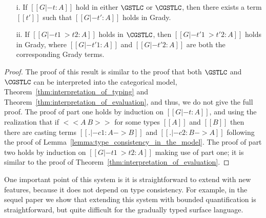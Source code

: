 \begin{lemma}[Translations]
  \label{lemma:translations}
  \begin{center}
    \begin{itemize}
    \item[] 
    \item[i.] If $[[G |- t : A]]$ hold in either $\GSTLC$ or
      $\CGSTLC$, then there exists a term
      $[[t']]$ such that $[[G |- t' : A]]$ holds in Grady.
    \item[ii.] If $[[G |- t1 ~> t2 : A]]$ holds in $\CGSTLC$, then
      $[[G |- t'1 ~> t'2 : A]]$ holds in Grady, where $[[G |- t'1 :
        A]]$ and $[[G |- t'2 : A]]$ are both the corresponding Grady
      terms.
    \end{itemize}
  \end{center}
\end{lemma}
\begin{proof}
  The proof of this result is similar to the proof that both
  $\GSTLC$ and $\CGSTLC$ can be
  interpreted into the categorical model,
  Theorem~\ref{thm:interpretation_of_typing} and
  Theorem~\ref{thm:interpretation_of_evaluation}, and thus, we do not
  give the full proof.  The proof of part one holds by induction on
  $[[G |- t : A]]$, and using the realization that if $<<A ~ B>>$ for
  some types $[[A]]$ and $[[B]]$ then there are casting terms $[[. |-
      c1 : A -> B]]$ and $[[. |- c2 : B -> A]]$ following the proof of
  Lemma~\ref{lemma:type_consistency_in_the_model}. The proof of part
  two holds by induction on $[[G |- t1 ~> t2 : A]]$ making use of part
  one; it is similar to the proof of
  Theorem~\ref{thm:interpretation_of_evaluation}.
\end{proof}

One important point of this system is it is straightforward to extend
with new features, because it does not depend on type consistency.
For example, in the sequel paper we show that extending this system with
bounded quantification is straightforward, but quite difficult for the
gradually typed surface language.


